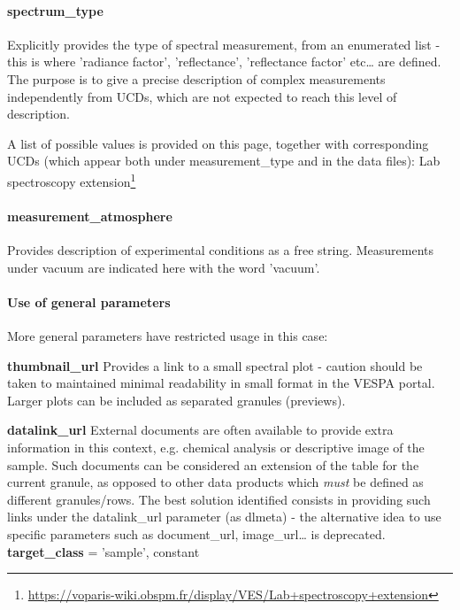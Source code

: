 \documentclass[11pt,a4paper]{ivoa}
\begin{document}
\paragraph{spectrum\_type}

Explicitly provides the type of spectral measurement, from an enumerated list - this is where 'radiance factor', 'reflectance', 'reflectance factor' etc… are defined. The purpose is to give a precise description of complex measurements independently from UCDs, which are not expected to reach this level of description.

A list of possible values is provided on this page, together with corresponding UCDs (which appear both under measurement\_type and in the data files): Lab spectroscopy extension\footnote{\url{https://voparis-wiki.obspm.fr/display/VES/Lab+spectroscopy+extension}}

\paragraph{measurement\_atmosphere}

Provides description of experimental conditions as a free string. Measurements under vacuum are indicated here with the word 'vacuum'.

\paragraph{Use of general parameters}

More general parameters have restricted usage in this case:

\textbf{thumbnail\_url }Provides a link to a small spectral plot - caution should be taken to maintained minimal readability in small format in the VESPA portal. Larger plots can be included as separated granules (previews).

\textbf{datalink\_url} External documents are often available to provide extra information in this context, e.g. chemical analysis or descriptive image of the sample. Such documents can be considered an extension of the table for the current granule, as opposed to other data products which \emph{must} be defined as different granules/rows. The best solution identified consists in providing such links under the datalink\_url parameter (as dlmeta)  - the alternative idea to use specific parameters such as document\_url, image\_url… is deprecated.\\

\textbf{target\_class }= 'sample', constant
\end{document}
